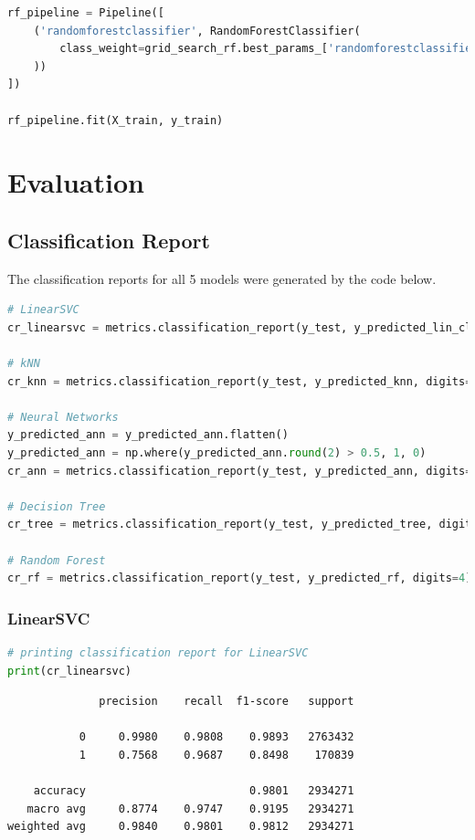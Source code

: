 \documentclass{article}
\begin{document}
\begin{lstlisting}[language=Python]
rf_pipeline = Pipeline([
    ('randomforestclassifier', RandomForestClassifier(
        class_weight=grid_search_rf.best_params_['randomforestclassifier__class_weight']
    ))
])

rf_pipeline.fit(X_train, y_train)
\end{lstlisting}

\section{Evaluation}

\subsection{Classification Report}

The classification reports for all 5 models were generated by the code below.

\begin{lstlisting}[language=Python]
# LinearSVC
cr_linearsvc = metrics.classification_report(y_test, y_predicted_lin_clf, digits=4)

# kNN
cr_knn = metrics.classification_report(y_test, y_predicted_knn, digits=4)

# Neural Networks
y_predicted_ann = y_predicted_ann.flatten()
y_predicted_ann = np.where(y_predicted_ann.round(2) > 0.5, 1, 0)
cr_ann = metrics.classification_report(y_test, y_predicted_ann, digits=4)

# Decision Tree
cr_tree = metrics.classification_report(y_test, y_predicted_tree, digits=4)

# Random Forest
cr_rf = metrics.classification_report(y_test, y_predicted_rf, digits=4)
\end{lstlisting}

\subsubsection{LinearSVC}
\begin{lstlisting}[language=Python]
# printing classification report for LinearSVC
print(cr_linearsvc)
\end{lstlisting}
\begin{verbatim}  
              precision    recall  f1-score   support

           0     0.9980    0.9808    0.9893   2763432
           1     0.7568    0.9687    0.8498    170839

    accuracy                         0.9801   2934271
   macro avg     0.8774    0.9747    0.9195   2934271
weighted avg     0.9840    0.9801    0.9812   2934271
\end{verbatim}
\end{document}
